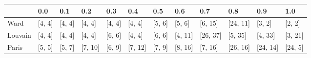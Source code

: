 \begin{tabular}{llllllllllll}
\toprule
{} &     0.0 &     0.1 &      0.2 &     0.3 &      0.4 &     0.5 &      0.6 &       0.7 &       0.8 &       0.9 &      1.0 \\
\midrule
Ward    &  [4, 4] &  [4, 4] &   [4, 4] &  [4, 4] &   [4, 4] &  [5, 6] &   [5, 6] &   [6, 15] &  [24, 11] &    [3, 2] &   [2, 2] \\
Louvain &  [4, 4] &  [4, 4] &   [4, 4] &  [6, 6] &   [4, 4] &  [6, 6] &  [4, 11] &  [26, 37] &   [5, 35] &   [4, 33] &  [3, 21] \\
Paris   &  [5, 5] &  [5, 7] &  [7, 10] &  [6, 9] &  [7, 12] &  [7, 9] &  [8, 16] &   [7, 16] &  [26, 16] &  [24, 14] &  [24, 5] \\
\bottomrule
\end{tabular}
